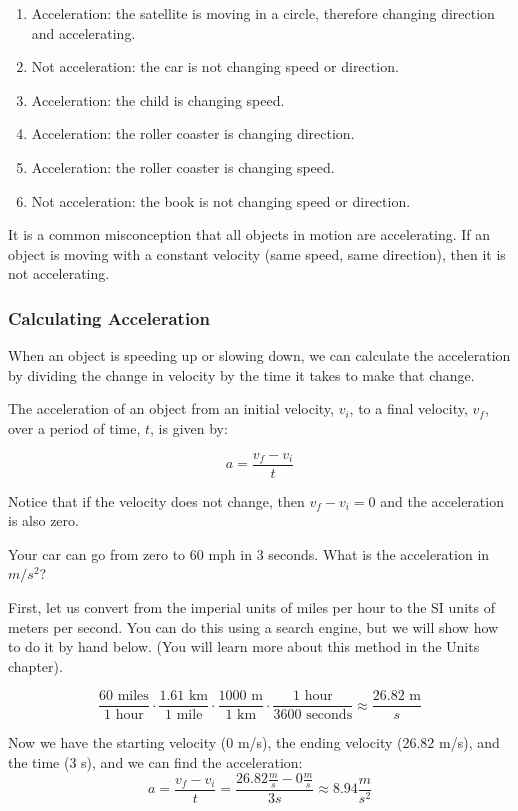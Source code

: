\begin{Answer}[ref = accel]
\begin{enumerate}
\item Acceleration: the satellite is moving in a circle, therefore changing 
direction and accelerating.
\item Not acceleration: the car is not changing speed or direction.
\item Acceleration: the child is changing speed.
\item Acceleration: the roller coaster is changing direction.
\item Acceleration: the roller coaster is changing speed. 
\item Not acceleration: the book is not changing speed or direction.
\end{enumerate}
\end{Answer}

It is a common misconception that all objects in motion are accelerating. If an 
object is moving with a constant velocity (same speed, same direction), then it 
is not accelerating. 

\subsubsection{Calculating Acceleration}
When an object is speeding up or slowing down, we can calculate the acceleration 
by dividing the change in velocity by the time it takes to make that change. 

\begin{mdframed}[style = important, frametitle = {Calculating Acceleration}]
The acceleration of an object from an initial velocity, $v_i$, to a final
velocity, $v_f$, over a period of time, $t$, is given by:

$$a = \frac{v_f - v_i}{t}$$
\end{mdframed}

Notice that if the velocity does not change, then $v_f - v_i = 0$ and the 
acceleration is also zero.

\begin{Worked}
\begin{Problem}
Your car can go from zero to 60 mph in 3 seconds. What is the
acceleration in $m / s^2$?
\end{Problem}
\begin{Solution}
First, let us convert from the imperial units of miles per
hour to the SI units of meters per second. You can do this using a search engine, 
but we will show how to do it by hand below. (You will learn more about this 
method in the Units chapter).

$$\frac{60 \text{ miles}}{1 \text{ hour}} \cdot \frac{1.61 \text{ km}}{1 
\text{ mile}} \cdot \frac{1000\text{ m}}{1\text{ km}} \cdot \frac{1\text{ hour}}{
3600\text{ seconds}} \approx \frac{26.82\text{ m}}{s}$$

Now we have the starting velocity (0 m/s), the ending velocity (26.82 m/s), and 
the time (3 s), and we can find the acceleration:
$$a = \frac{v_f - v_i}{t} = \frac{26.82\frac{m}{s} - 0\frac{m}{s}}{3s} \approx 
8.94 \frac{m}{s^2}$$
\end{Solution}
\end{Worked}

